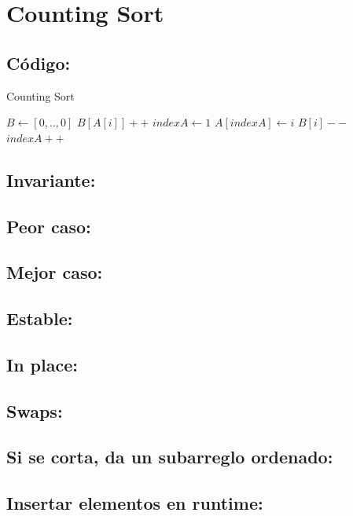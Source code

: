 \documentclass[a4paper]{article}
\begin{document}
\newpage
\section{Counting Sort}

\subsection{C\'odigo:}
\begin{algorithm}
\caption{Counting Sort}\label{selection}
\begin{algorithmic}[1]
	\State $B \gets [0,..,0]$ 
	 
		\State $B[A[i]]++$
	\EndFor
	\State $indexA \gets 1$
	 
			\State $A[indexA] \gets i$
			\State $B[i]--$
			\State $indexA++$
		\EndWhile
	\EndFor
\EndProcedure
\end{algorithmic}
\end{algorithm}

\subsection{Invariante:}

\subsection{Peor caso:}
\subsection{Mejor caso:}
\subsection{Estable:}
\subsection{In place:}
\subsection{Swaps:}
\subsection{Si se corta, da un subarreglo ordenado:}
\subsection{Insertar elementos en runtime:}
\end{document}
